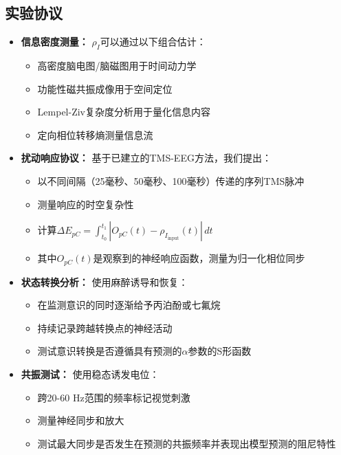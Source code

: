 \documentclass[12pt]{article}
\begin{document}
\begin{CJK}{UTF8}{gbsn}
\subsection{实验协议}

\begin{itemize}
    \item \textbf{信息密度测量：} $\rho_I$可以通过以下组合估计：
    \begin{itemize}[label=--]
        \item 高密度脑电图/脑磁图用于时间动力学
        \item 功能性磁共振成像用于空间定位
        \item Lempel-Ziv复杂度分析用于量化信息内容\cite{schartner2015,casali2013}
        \item 定向相位转移熵测量信息流\cite{hillebrand2016}
    \end{itemize}
    
    \item \textbf{扰动响应协议：} 基于已建立的TMS-EEG方法\cite{casarotto2016}，我们提出：
    \begin{itemize}[label=--]
        \item 以不同间隔（25毫秒、50毫秒、100毫秒）传递的序列TMS脉冲
        \item 测量响应的时空复杂性
        \item 计算$\Delta E_{pC} = \int_{t_0}^{t_1} |O_{pC}(t) - \rho_{I_{\text{input}}}(t)| \, dt$
        \item 其中$O_{pC}(t)$是观察到的神经响应函数，测量为归一化相位同步
    \end{itemize}
    
    \item \textbf{状态转换分析：} 使用麻醉诱导和恢复：
    \begin{itemize}[label=--]
        \item 在监测意识的同时逐渐给予丙泊酚或七氟烷
        \item 持续记录跨越转换点的神经活动
        \item 测试意识转换是否遵循具有预测的$\alpha$参数的S形函数
    \end{itemize}
    
    \item \textbf{共振测试：} 使用稳态诱发电位：
    \begin{itemize}[label=--]
        \item 跨20-60 Hz范围的频率标记视觉刺激
        \item 测量神经同步和放大
        \item 测试最大同步是否发生在预测的共振频率并表现出模型预测的阻尼特性
    \end{itemize}
\end{itemize}


\end{CJK}
\end{document}
